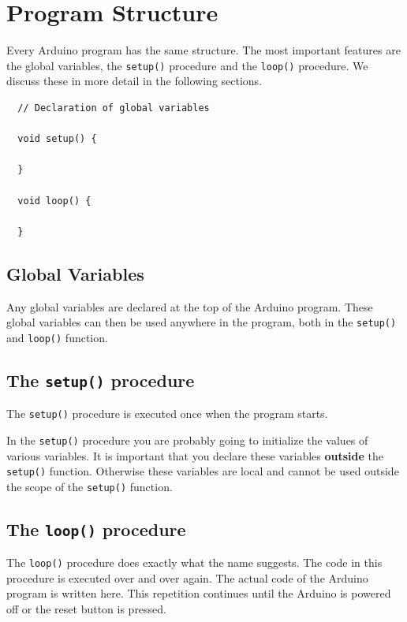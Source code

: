 \documentclass[11pt,fleqn]{book} %
\begin{document}
\section{Program Structure}
Every Arduino program has the same structure. The most important features are the global variables, the \texttt{setup()} procedure and the \texttt{loop()} procedure. We discuss these in more detail in the following sections.

\begin{definition}
	\phantom{}
	\begin{verbatim}
  // Declaration of global variables

  void setup() {

  }

  void loop() {

  }
	\end{verbatim}
	\vspace{0cm}
\end{definition}

\subsection{Global Variables}
Any global variables are declared at the top of the Arduino program. These global variables can then be used anywhere in the program, both in the \texttt{setup()} and \texttt{loop()} function.

\subsection{The \texttt{setup()} procedure}
The \texttt{setup()} procedure is executed once when the program starts.

\begin{remark}
    In the \texttt{setup()} procedure you are probably going to initialize the values of various variables. It is important that you declare these variables \textbf{outside} the \texttt{setup()} function. Otherwise these variables are local and cannot be used outside the scope of the \texttt{setup()} function.
\end{remark}

\subsection{The \texttt{loop()} procedure}
The \texttt{loop()} procedure does exactly what the name suggests. The code in this procedure is executed over and over again. The actual code of the Arduino program is written here. This repetition continues until the Arduino is powered off or the reset button is pressed.
\end{document}

